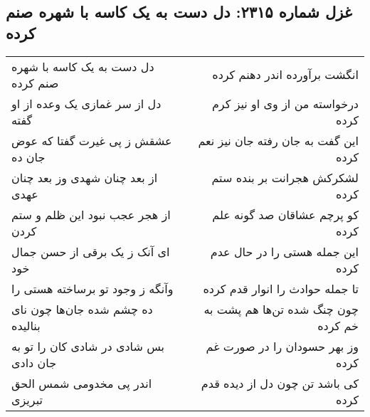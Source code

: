 \begin{center}
\section*{غزل شماره ۲۳۱۵: دل دست به یک کاسه با شهره صنم کرده}
\label{sec:2315}
\begin{longtable}{l p{0.5cm} r}
دل دست به یک کاسه با شهره صنم کرده
&&
انگشت برآورده اندر دهنم کرده
\\
دل از سر غمازی یک وعده از او گفته
&&
درخواسته من از وی او نیز کرم کرده
\\
عشقش ز پی غیرت گفتا که عوض جان ده
&&
این گفت به جان رفته جان نیز نعم کرده
\\
از بعد چنان شهدی وز بعد چنان عهدی
&&
لشکرکش هجرانت بر بنده ستم کرده
\\
از هجر عجب نبود این ظلم و ستم کردن
&&
کو پرچم عشاقان صد گونه علم کرده
\\
ای آنک ز یک برقی از حسن جمال خود
&&
این جمله هستی را در حال عدم کرده
\\
وآنگه ز وجود تو برساخته هستی را
&&
تا جمله حوادث را انوار قدم کرده
\\
ده چشم شده جان‌ها چون نای بنالیده
&&
چون چنگ شده تن‌ها هم پشت به خم کرده
\\
بس شادی در شادی کان را تو به جان دادی
&&
وز بهر حسودان را در صورت غم کرده
\\
اندر پی مخدومی شمس الحق تبریزی
&&
کی باشد تن چون دل از دیده قدم کرده
\\
\end{longtable}
\end{center}
